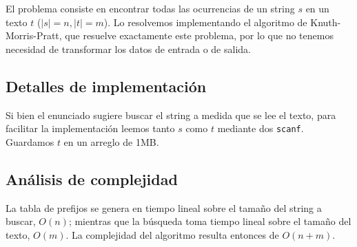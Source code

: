 El problema consiste en encontrar todas las ocurrencias de un string $s$
en un texto $t$ ($|s| = n, |t| = m$). Lo resolvemos implementando el algoritmo
de Knuth-Morris-Pratt, que resuelve exactamente este problema, por lo que no
tenemos necesidad de transformar los datos de entrada o de salida.

\subsection*{Detalles de implementación}

Si bien el enunciado sugiere buscar el string a medida que se lee el texto, para
facilitar la implementación leemos tanto $s$ como $t$ mediante dos {\tt scanf}.
Guardamos $t$ en un arreglo de 1MB.

\subsection*{Análisis de complejidad}

La tabla de prefijos se genera en tiempo lineal sobre el tamaño del string a
buscar, $O(n)$; mientras que la búsqueda toma tiempo lineal sobre el tamaño
del texto, $O(m)$. La complejidad del algoritmo resulta entonces de $O(n+m)$.
